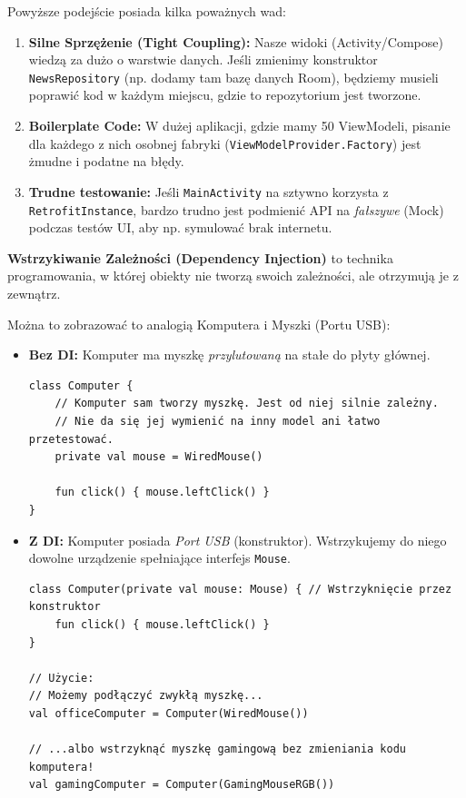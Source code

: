 Powyższe podejście posiada kilka poważnych wad:
\begin{enumerate}
    \item \textbf{Silne Sprzężenie (Tight Coupling):} Nasze widoki (Activity/Compose) wiedzą za dużo o warstwie danych. Jeśli zmienimy konstruktor \texttt{NewsRepository} (np. dodamy tam bazę danych Room), będziemy musieli poprawić kod w każdym miejscu, gdzie to repozytorium jest tworzone.
    \item \textbf{Boilerplate Code:} W dużej aplikacji, gdzie mamy 50 ViewModeli, pisanie dla każdego z nich osobnej fabryki (\texttt{ViewModelProvider.Factory}) jest żmudne i podatne na błędy.
    \item \textbf{Trudne testowanie:} Jeśli \texttt{MainActivity} na sztywno korzysta z \texttt{RetrofitInstance}, bardzo trudno jest podmienić API na \textit{fałszywe} (Mock) podczas testów UI, aby np. symulować brak internetu.
\end{enumerate}

\textbf{Wstrzykiwanie Zależności (Dependency Injection)} to technika programowania, w której obiekty nie tworzą swoich zależności, ale otrzymują je z zewnątrz.

Można to zobrazować to analogią Komputera i Myszki (Portu USB):

\begin{itemize}
    \item \textbf{Bez DI:} Komputer ma myszkę \textit{przylutowaną} na stałe do płyty głównej.
\begin{verbatim}
class Computer {
    // Komputer sam tworzy myszkę. Jest od niej silnie zależny.
    // Nie da się jej wymienić na inny model ani łatwo przetestować.
    private val mouse = WiredMouse() 
    
    fun click() { mouse.leftClick() }
}
\end{verbatim}
    \item \textbf{Z DI:} Komputer posiada \textit{Port USB} (konstruktor). Wstrzykujemy do niego dowolne urządzenie spełniające interfejs \texttt{Mouse}.
\begin{verbatim}
class Computer(private val mouse: Mouse) { // Wstrzyknięcie przez konstruktor
    fun click() { mouse.leftClick() }
}

// Użycie:
// Możemy podłączyć zwykłą myszkę...
val officeComputer = Computer(WiredMouse()) 

// ...albo wstrzyknąć myszkę gamingową bez zmieniania kodu komputera!
val gamingComputer = Computer(GamingMouseRGB())
\end{verbatim}

\end{itemize}

